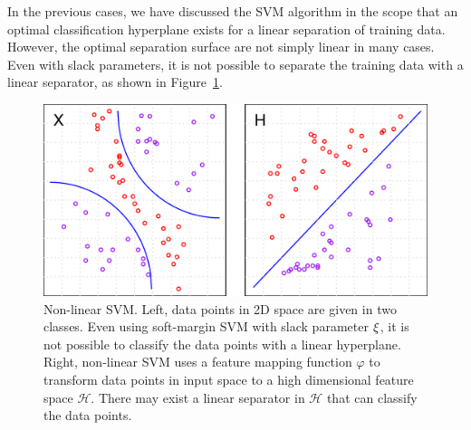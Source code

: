 \documentclass[english]{tktltiki}
\newcommand{\Hcal}{\mathcal{H}} %
\newcommand{\xib}{{\bf \xi}}
\begin{document}
In the previous cases, we have discussed the SVM algorithm in the scope that an optimal classification hyperplane exists for a linear separation of training data. However, the optimal separation surface are not simply linear in many cases. Even with slack parameters, it is not possible to separate the training data with a linear separator, as shown in Figure~\ref{nonlinear_svm}. 

\begin{figure}[t]
\begin{center}
\centering
\includegraphics[width=.9\columnwidth]{./plots/kernel_svm.pdf}
\caption[Non-linear SVM.]{Non-linear SVM. Left, data points in 2D space are given in two classes. Even using soft-margin SVM with slack parameter $\xib$, it is not possible to classify the data points with a linear hyperplane. Right, non-linear SVM uses a feature mapping function $\varphi$ to transform data points in input space to a high dimensional feature space $\Hcal$. There may exist a linear separator in $\Hcal$ that can classify the data points.}
\label{nonlinear_svm}
\end{center}
\end{figure}

\end{document}
